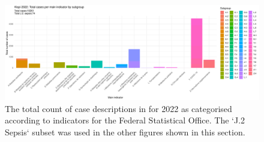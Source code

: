 \begin{figure}[h] \hspace*{0cm} 
\begin{center}
	\includegraphics[width=1\textwidth]{../stats/foph_key_stats/output/p_cases_per_indicator_kispi_2022}
	\caption{The total count of case descriptions in \kispi for 2022 as categorised according to indicators for the Federal Statistical Office. 
	The `J.2 Sepsis` subset was used in the other figures shown in this section.}
	\label{fig:p_cases_per_indicator_kispi_2022}
\end{center}
\end{figure}

